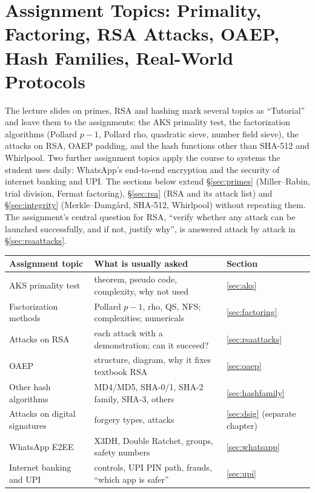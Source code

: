 \section{Assignment Topics: Primality, Factoring, RSA Attacks, OAEP, Hash Families, Real-World Protocols}\label{sec:assign}
\usetikzlibrary{decorations.pathreplacing}

The lecture slides on primes, RSA and hashing mark several topics as ``Tutorial'' and leave them to the assignments: the AKS primality test, the factorization algorithms (Pollard $p - 1$, Pollard rho, quadratic sieve, number field sieve), the attacks on RSA, OAEP padding, and the hash functions other than SHA-512 and Whirlpool. Two further assignment topics apply the course to systems the student uses daily: WhatsApp's end-to-end encryption and the security of internet banking and UPI. The sections below extend \S\ref{sec:primes} (Miller--Rabin, trial division, Fermat factoring), \S\ref{sec:rsa} (RSA and its attack list) and \S\ref{sec:integrity} (Merkle--Damg\aa rd, SHA-512, Whirlpool) without repeating them. The assignment's central question for RSA, ``verify whether any attack can be launched successfully, and if not, justify why'', is answered attack by attack in \S\ref{sec:rsaattacks}.

\begin{center}\small
\begin{tabular}{@{}lll@{}}
\toprule
Assignment topic & What is usually asked & Section\\
\midrule
AKS primality test & theorem, pseudo code, complexity, why not used & \ref{sec:aks}\\
Factorization methods & Pollard $p - 1$, rho, QS, NFS; complexities; numericals & \ref{sec:factoring}\\
Attacks on RSA & each attack with a demonstration; can it succeed? & \ref{sec:rsaattacks}\\
OAEP & structure, diagram, why it fixes textbook RSA & \ref{sec:oaep}\\
Other hash algorithms & MD4/MD5, SHA-0/1, SHA-2 family, SHA-3, others & \ref{sec:hashfamily}\\
Attacks on digital signatures & forgery types, attacks & \ref{sec:dsig} (separate chapter)\\
WhatsApp E2EE & X3DH, Double Ratchet, groups, safety numbers & \ref{sec:whatsapp}\\
Internet banking and UPI & controls, UPI PIN path, frauds, ``which app is safer'' & \ref{sec:upi}\\
\bottomrule
\end{tabular}
\end{center}

